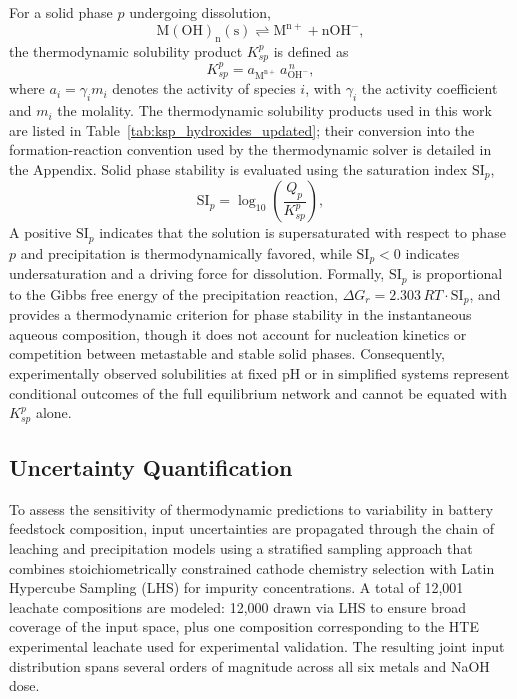 \documentclass[final,2p,times]{elsarticle}
\begin{document}
For a solid phase $p$ undergoing dissolution,
\begin{equation}
\mathrm{M(OH)_n(s) \rightleftharpoons M^{n+} + nOH^-},
\end{equation}
the thermodynamic solubility product $K_{sp}^p$ is defined as
\[
K_{sp}^p = a_{\mathrm{M^{n+}}} \, a_{\mathrm{OH^-}}^{\,n},
\]
where $a_i=\gamma_i m_i$ denotes the activity of species $i$, with $\gamma_i$ the activity coefficient and $m_i$ the molality. The thermodynamic solubility products used in this work are listed in Table~\ref{tab:ksp_hydroxides_updated}; their conversion into the formation-reaction convention used by the thermodynamic solver is detailed in the Appendix. Solid phase stability is evaluated using the saturation index $\mathrm{SI}_p$,
\begin{equation}
\mathrm{SI}_p = \log_{10}\left(\frac{Q_p}{K_{sp}^p}\right),
\end{equation}
\noindent
A positive $\mathrm{SI}_p$ indicates that the solution is supersaturated with respect to phase $p$ and precipitation is thermodynamically favored, while $\mathrm{SI}_p < 0$ indicates undersaturation and a driving force for dissolution. Formally, $\mathrm{SI}_p$ is proportional to the Gibbs free energy of the precipitation reaction, $\Delta G_r = 2.303\,RT\cdot\mathrm{SI}_p$, and provides a thermodynamic criterion for phase stability in the instantaneous aqueous composition, though it does not account for nucleation kinetics or competition between metastable and stable solid phases. Consequently, experimentally observed solubilities at fixed pH or in simplified systems represent conditional outcomes of the full equilibrium network and cannot be equated with $K_{sp}^p$ alone. 


\subsection{Uncertainty Quantification}

To assess the sensitivity of thermodynamic predictions to variability in battery feedstock composition, input uncertainties are propagated through the chain of leaching and precipitation models using a stratified sampling approach that combines stoichiometrically constrained cathode chemistry selection with Latin Hypercube Sampling (LHS) for impurity concentrations. A total of 12{,}001 leachate compositions are modeled: 12{,}000 drawn via LHS to ensure broad coverage of the input space, plus one composition corresponding to the HTE experimental leachate used for experimental validation. The resulting joint input distribution spans several orders of magnitude across all six metals and NaOH dose.
\end{document}
